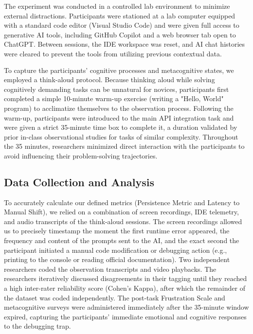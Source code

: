 \documentclass[../tanulmany.tex]{subfiles}
\begin{document}
The experiment was conducted in a controlled lab environment to minimize external distractions. Participants were stationed at a lab computer equipped with a standard code editor (Visual Studio Code) and were given full access to generative AI tools, including GitHub Copilot and a web browser tab open to ChatGPT. 
Between sessions, the IDE workspace was reset, and AI chat histories were cleared to prevent the tools from utilizing previous contextual data.
\par To capture the participants' cognitive processes and metacognitive states, we employed a think-aloud protocol. 
Because thinking aloud while solving cognitively demanding tasks can be unnatural for novices, participants first 
completed a simple 10-minute warm-up exercise (writing a "Hello, World" program) to acclimatize themselves to the 
observation process. Following the warm-up, participants were introduced to the main API integration task and were given 
a strict 35-minute time box to complete it, a duration validated by prior in-class observational studies for tasks 
of similar complexity. Throughout the 35 minutes, researchers minimized direct interaction with the participants 
to avoid influencing their problem-solving trajectories.

\subsection{Data Collection and Analysis}

To accurately calculate our defined metrics (Persistence Metric and Latency to Manual Shift), we relied 
on a combination of screen recordings, IDE telemetry, and audio transcripts of the think-aloud sessions.
The screen recordings allowed us to precisely timestamp the moment the first runtime error appeared, the frequency and content of the prompts sent to the AI, and the exact second the participant initiated a manual code modification or debugging action (e.g., printing to the console or reading official documentation). 
Two independent researchers coded the observation transcripts and video playbacks. 
The researchers iteratively discussed disagreements in their tagging until they reached a high inter-rater 
reliability score (Cohen's Kappa), after which the remainder of the dataset was coded independently. 
The post-task Frustration Scale and metacognitive surveys were administered immediately after the 35-minute 
window expired, capturing the participants' immediate emotional and cognitive responses to the debugging trap.
\end{document}
